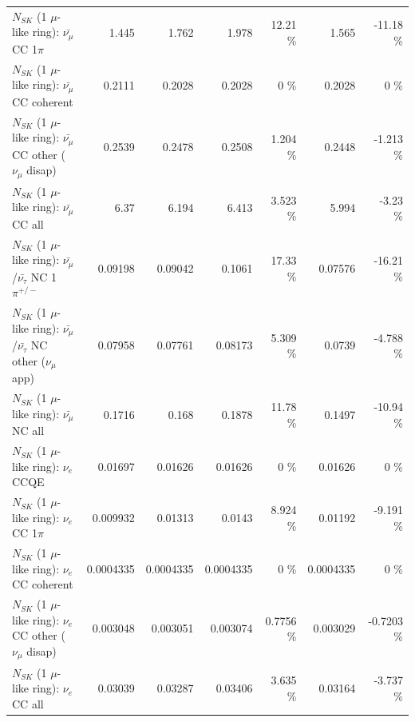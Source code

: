 \begin{table}
\begin{tabular}{| l | r | r | r  r | r  r |}
                         $N_{SK}$ (1 $\mu$-like ring): $\bar{\nu_\mu}$ CC 1$\pi$ &           1.445 &           1.762 &           1.978 &    12.21 \%  &           1.565 &   -11.18 \%  \\ 
                       $N_{SK}$ (1 $\mu$-like ring): $\bar{\nu_\mu}$ CC coherent &          0.2111 &          0.2028 &          0.2028 &        0 \%  &          0.2028 &        0 \%  \\ 
        $N_{SK}$ (1 $\mu$-like ring): $\bar{\nu_\mu}$ CC other ($\nu_\mu$ disap) &          0.2539 &          0.2478 &          0.2508 &    1.204 \%  &          0.2448 &   -1.213 \%  \\ 
                          $N_{SK}$ (1 $\mu$-like ring): $\bar{\nu_{\mu}}$ CC all &            6.37 &           6.194 &           6.413 &    3.523 \%  &           5.994 &    -3.23 \%  \\ 
\hline
  $N_{SK}$ (1 $\mu$-like ring): $\bar{\nu_\mu}$/$\bar{\nu_\tau}$ NC 1$\pi^{+/-}$ &         0.09198 &         0.09042 &          0.1061 &    17.33 \%  &         0.07576 &   -16.21 \%  \\ 
$N_{SK}$ (1 $\mu$-like ring): $\bar{\nu_\mu}$/$\bar{\nu_\tau}$ NC other ($\nu_\mu$ app) &         0.07958 &         0.07761 &         0.08173 &    5.309 \%  &          0.0739 &   -4.788 \%  \\ 
                          $N_{SK}$ (1 $\mu$-like ring): $\bar{\nu_{\mu}}$ NC all &          0.1716 &           0.168 &          0.1878 &    11.78 \%  &          0.1497 &   -10.94 \%  \\ 
\hline
\hline
\hline
                                      $N_{SK}$ (1 $\mu$-like ring): $\nu_e$ CCQE &         0.01697 &         0.01626 &         0.01626 &        0 \%  &         0.01626 &        0 \%  \\ 
                                 $N_{SK}$ (1 $\mu$-like ring): $\nu_e$ CC 1$\pi$ &        0.009932 &         0.01313 &          0.0143 &    8.924 \%  &         0.01192 &   -9.191 \%  \\ 
                               $N_{SK}$ (1 $\mu$-like ring): $\nu_e$ CC coherent &       0.0004335 &       0.0004335 &       0.0004335 &        0 \%  &       0.0004335 &        0 \%  \\ 
                $N_{SK}$ (1 $\mu$-like ring): $\nu_e$ CC other ($\nu_\mu$ disap) &        0.003048 &        0.003051 &        0.003074 &   0.7756 \%  &        0.003029 &  -0.7203 \%  \\ 
                                  $N_{SK}$ (1 $\mu$-like ring): $\nu_{e}$ CC all &         0.03039 &         0.03287 &         0.03406 &    3.635 \%  &         0.03164 &   -3.737 \%  \\ 

\end{tabular}
\end{table}
